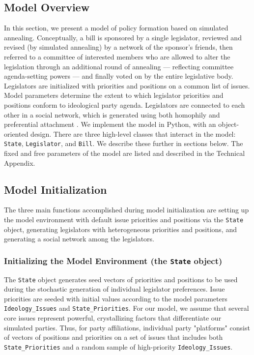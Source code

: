 \documentclass[pdftex,12pt]{llncs}
\begin{document}
\subsection{Model Overview}
In this section, we present a model of policy formation based on simulated annealing. Conceptually, a bill is sponsored by a single legislator, reviewed and revised (by simulated annealing) by a network of the sponsor's friends, then referred to a committee of interested members who are allowed to alter the legislation through an additional round of annealing --- reflecting committee agenda-setting powers \parencite{cm93, cm05} --- and finally voted on by the entire legislative body.
Legislators are initialized with priorities and positions on a common list of issues. Model parameters determine the extent to which legislator priorities and positions conform to ideological party agenda. Legislators are connected to each other in a social network, which is generated using both homophily \parencite{msc01, br11} and preferential attachment \parencite{Barabasi1999}.
We implement the model in Python, with an object-oriented design.
There are three high-level classes that interact in the model: \texttt{State}, \texttt{Legislator}, and \texttt{Bill}.
We describe these further in sections below.
The fixed and free parameters of the model are listed and described in the Technical Appendix.

\subsection{Model Initialization}
The three main functions accomplished during model initialization are setting up the model environment with default issue priorities and positions via the \texttt{State} object, generating legislators with heterogeneous priorities and positions, and generating a social network among the legislators.

\subsubsection{Initializing the Model Environment (the \texttt{State} object)}
The \texttt{State} object generates seed vectors of priorities and positions to be used during the stochastic generation of individual legislator preferences. Issue priorities are seeded with initial values according to the model parameters \texttt{Ideology\_Issues} and \texttt{State\_Priorities}. For our model, we assume that several core issues represent powerful, crystallizing factors that differentiate our simulated parties. Thus, for party affiliations, individual party "platforms" consist of vectors of positions and priorities on a set of issues that includes both \texttt{State\_Priorities} and a random sample of high-priority \texttt{Ideology\_Issues}.
\end{document}
